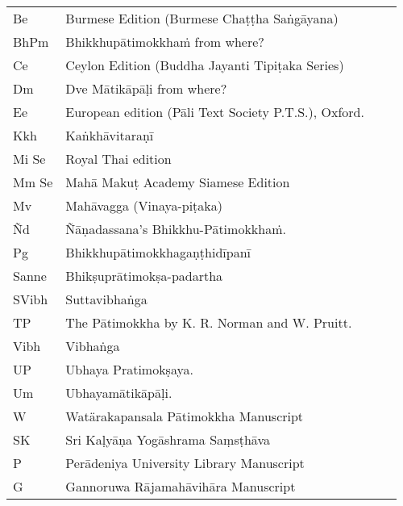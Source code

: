 \else

\begin{tabular}{@{}llll@{}}
  Be & Burmese Edition (Burmese Chaṭṭha Saṅgāyana)\\
  BhPm & Bhikkhupātimokkhaṁ from where?\\
  Ce & Ceylon Edition (Buddha Jayanti Tipiṭaka Series)\\
  Dm & Dve Mātikāpāḷi from where?\\
  Ee & European edition (Pāli Text Society P.T.S.), Oxford.\\
  Kkh & Kaṅkhāvitaraṇī\\
  Mi Se & Royal Thai edition\\
  Mm Se & Mahā Makuṭ Academy Siamese Edition\\
  Mv & Mahāvagga (Vinaya-piṭaka)\\
  Ñd & Ñāṇadassana's Bhikkhu-Pātimokkhaṁ.\\
  Pg & Bhikkhupātimokkhagaṇṭhidīpanī\\
  Sanne & Bhikṣuprātimokṣa-padartha\\
  SVibh & Suttavibhaṅga\\
  TP & The Pātimokkha by K. R. Norman and W. Pruitt.\\
  Vibh & Vibhaṅga\\
  UP & Ubhaya Pratimokṣaya.\\
  Um & Ubhayamātikāpāḷi.\\
  W & Watärakapansala Pātimokkha Manuscript\\
  SK & Sri Kaḷyāṇa Yogāshrama Saṃsṭhāva\\
  P & Perādeniya University Library Manuscript\\
  G & Gannoruwa Rājamahāvihāra Manuscript\\
\end{tabular}

\medskip

\fi


